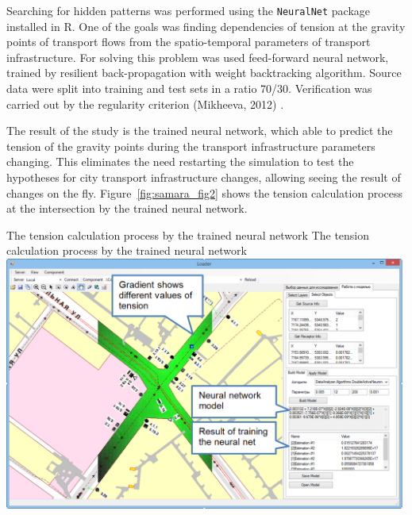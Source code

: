 Searching for hidden patterns was performed using the \lstinline|NeuralNet| package installed in R. One of the goals was finding dependencies of tension at the gravity points of transport flows from the spatio-temporal parameters of transport infrastructure. For solving this problem was used feed-forward neural network, trained by resilient back-propagation with weight backtracking algorithm. Source data were split into training and test sets in a ratio 70/30. Verification was carried out by the regularity criterion (Mikheeva, 2012) \citep[][]{}.

The result of the study is the trained neural network, which able to predict the tension of the gravity points during the transport infrastructure parameters changing. This eliminates the need restarting the simulation to test the hypotheses for city transport infrastructure changes, allowing seeing the result of changes on the fly. Figure~\ref{fig:samara_fig2} shows the tension calculation process at the intersection by the trained neural network.

\createfigure%
{The tension calculation process by the trained neural network}%
{The tension calculation process by the trained neural network}%
{\label{fig:samara_fig2}}%
{\includegraphics[width=0.99\textwidth, angle=0]{./scenarios/figures/samara_fig2.png}}%
{}

